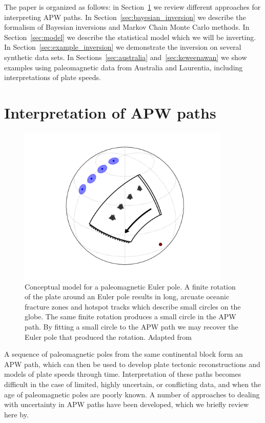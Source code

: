 \documentclass[preprint,12pt,authoryear]{elsarticle}
\begin{document}
The paper is organized as follows: in Section~\ref{sec:apwp} we review different
approaches for interpreting APW paths. In Section~\ref{sec:bayesian_inversion} we
describe the formalism of Bayesian inversions and Markov Chain Monte Carlo methods.
In Section~\ref{sec:model} we describe the statistical model which we will be inverting.
In Section~\ref{sec:example_inversion} we demonstrate the inversion on several
synthetic data sets. In Sections~\ref{sec:australia} and~\ref{sec:keweenawan}
we show examples using paleomagnetic data from Australia and Laurentia,
including interpretations of plate speeds.

\section{Interpretation of APW paths}
\label{sec:apwp}
\begin{figure}
\includegraphics[width=0.9\textwidth]{figures/cartoon/paleomagnetic_euler_pole.png}
\caption[Conceptual model for a paleomagnetic Euler pole.]{Conceptual model for a paleomagnetic Euler pole. A finite rotation of the plate around an Euler pole results in long, arcuate oceanic fracture zones and hotspot tracks which describe small circles on the globe. The same finite rotation produces a small circle in the APW path. By fitting a small circle to the APW path we may recover the Euler pole that produced the rotation. Adapted from \citet{gordon1984paleomagnetic}}
\label{fig:pep}
\end{figure}
A sequence of paleomagnetic poles from the same continental block form an APW path,
which can then be used to develop plate tectonic reconstructions and models
of plate speeds through time. Interpretation of these paths becomes difficult in the
case of limited, highly uncertain, or conflicting data, and when the age of paleomagnetic poles are poorly
known. A number of approaches to dealing with uncertainty in APW paths have been developed,
which we briefly review here by.
\end{document}
